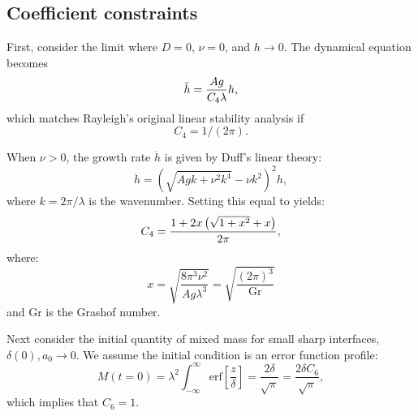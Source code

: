 \subsection{Coefficient constraints}
First, consider the limit where $D = 0$, $\nu = 0$, and $h \rightarrow 0$.
The dynamical equation becomes
\begin{equation} \elabel{first_constraint}
\ddot{h} = \frac{A g }{C_4 \lambda} h,
\end{equation}
which matches Rayleigh's original linear stability analysis if 
\begin{equation} 
C_4 = 1/(2 \pi).
\end{equation}

When $\nu > 0$, the growth rate $\ddot{h}$ is given by Duff's linear theory:
\begin{equation}
\ddot{h} = \left(\sqrt{A g k + \nu^2 k^4} - \nu k^2\right)^2 h,
\end{equation}
where $k = 2\pi / \lambda$ is the wavenumber.
Setting this equal to  yields:
\begin{equation} \elabel{c4}
C_4 = \frac{1 + 2x\left(\sqrt{1 + x^2} + x\right)}{2\pi},
\end{equation}
where:
\begin{equation}
x = \sqrt{\frac{8 \pi^3 \nu^2}{A g \lambda^3}} = \sqrt{\frac{(2 \pi)^3}{\text{Gr}}}
\end{equation}
and Gr is the Grashof number.

Next consider the initial quantity of mixed mass for small sharp interfaces, $\delta(0), a_0 \rightarrow 0$.
We assume the initial condition is an error function profile:
\begin{equation}
M(t=0) = \lambda^2 \int_{-\infty}^{\infty} \text{erf}\left[\frac{z}{\delta}\right] = \frac{2 \delta}{\sqrt{\pi}} = \frac{2 \delta C_6}{\sqrt{\pi}},
\end{equation}
which implies that $C_6 = 1$.

